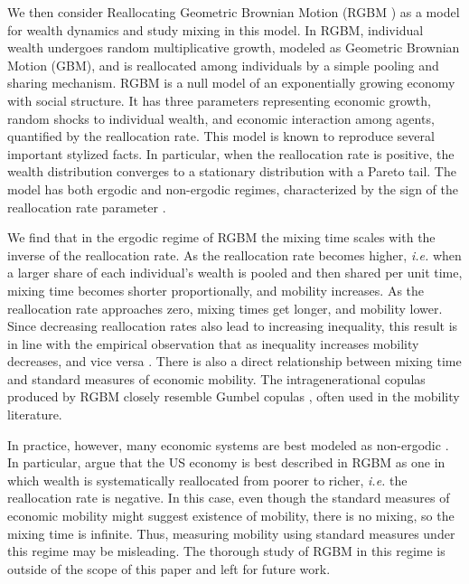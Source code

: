 \documentclass[11pt]{article}
\newcommand{\ie}{{\it i.e.}\xspace}
\numberwithin{equation}{section}
\begin{document}
We then consider Reallocating Geometric Brownian Motion (RGBM \citep{MarsiliMaslovZhang1998,LiuSerota2017,BermanPetersAdamou2019}) as a model for wealth dynamics and study mixing in this model. In RGBM, individual wealth undergoes random multiplicative growth, modeled as Geometric Brownian Motion (GBM), and is reallocated among individuals by a simple pooling and sharing mechanism. RGBM is a null model of an exponentially growing economy with social structure. It has three parameters representing economic growth, random shocks to individual wealth, and economic interaction among agents, quantified by the reallocation rate. This model is known to reproduce several important stylized facts. In particular, when the reallocation rate is positive, the wealth distribution converges to a stationary distribution with a Pareto tail. The model has both ergodic and non-ergodic regimes, characterized by the sign of the reallocation rate parameter \citep{BermanPetersAdamou2019}.

We find that in the ergodic regime of RGBM the mixing time scales with the inverse of the reallocation rate. As the reallocation rate becomes higher, \ie when a larger share of each individual's wealth is pooled and then shared per unit time, mixing time becomes shorter proportionally, and mobility increases. As the reallocation rate approaches zero, mixing times get longer, and mobility lower. Since decreasing reallocation rates also lead to increasing inequality, this result is in line with the empirical observation that as inequality increases mobility decreases, and vice versa \citep{corak2013}. There is also a direct relationship between mixing time and standard measures of economic mobility. The intragenerational copulas produced by RGBM closely resemble Gumbel copulas \citep{Gumbel1958,TrivediZimmer2007}, often used in the mobility literature.

In practice, however, many economic systems are best modeled as non-ergodic \citep{Peters2019b}. In particular, \citet{BermanPetersAdamou2019} argue that the US economy is best described in RGBM as one in which wealth is systematically reallocated from poorer to richer, \ie the reallocation rate is negative. In this case, even though the standard measures of economic mobility might suggest existence of mobility, there is no mixing, so the mixing time is infinite. Thus, measuring mobility using standard measures under this regime may be misleading. The thorough study of RGBM in this regime is outside of the scope of this paper and left for future work.
\end{document}
